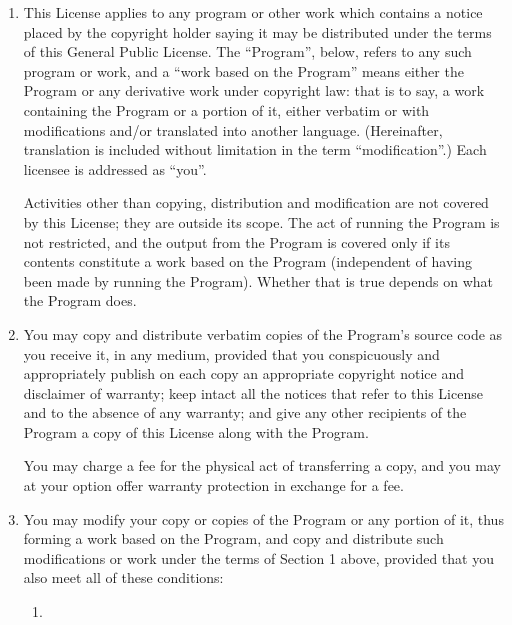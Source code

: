 \documentclass[12pt,a4paper]{article}
\begin{document}
\begin{enumerate}

\addtocounter{enumi}{-1}

\item 

This License applies to any program or other work which contains a notice
placed by the copyright holder saying it may be distributed under the
terms of this General Public License.  The ``Program'', below, refers to
any such program or work, and a ``work based on the Program'' means either
the Program or any derivative work under copyright law: that is to say, a
work containing the Program or a portion of it, either verbatim or with
modifications and/or translated into another language.  (Hereinafter,
translation is included without limitation in the term ``modification''.)
Each licensee is addressed as ``you''.

Activities other than copying, distribution and modification are not
covered by this License; they are outside its scope.  The act of
running the Program is not restricted, and the output from the Program
is covered only if its contents constitute a work based on the
Program (independent of having been made by running the Program).
Whether that is true depends on what the Program does.

\item You may copy and distribute verbatim copies of the Program's source
  code as you receive it, in any medium, provided that you conspicuously
  and appropriately publish on each copy an appropriate copyright notice
  and disclaimer of warranty; keep intact all the notices that refer to
  this License and to the absence of any warranty; and give any other
  recipients of the Program a copy of this License along with the Program.

You may charge a fee for the physical act of transferring a copy, and you
may at your option offer warranty protection in exchange for a fee.

\item

You may modify your copy or copies of the Program or any portion
of it, thus forming a work based on the Program, and copy and
distribute such modifications or work under the terms of Section 1
above, provided that you also meet all of these conditions:

\begin{enumerate}

\item 


\end{enumerate}
\end{enumerate}
\end{document}
